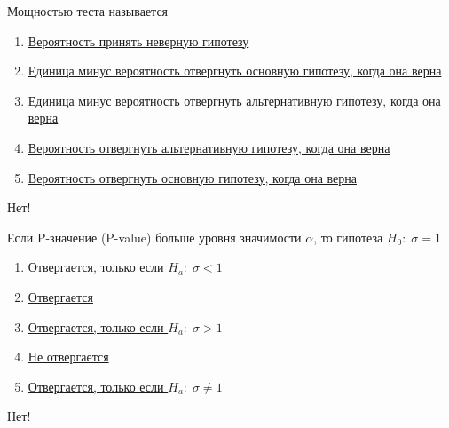 \documentclass[t]{beamer}
\begin{document}
 \begin{frame} \label{39-No} 
\begin{block}{39} 

Мощностью теста называется
 


 \end{block} 
\begin{enumerate} 
\item[] \hyperlink{39-No}{\beamergotobutton{} Вероятность принять неверную гипотезу}
\item[] \hyperlink{39-No}{\beamergotobutton{} Единица минус  вероятность отвергнуть основную гипотезу, когда она верна}
\item[] \hyperlink{39-Yes}{\beamergotobutton{} Единица минус  вероятность отвергнуть альтернативную гипотезу, когда она верна}
\item[] \hyperlink{39-No}{\beamergotobutton{} Вероятность отвергнуть альтернативную гипотезу, когда она верна}
\item[] \hyperlink{39-No}{\beamergotobutton{} Вероятность отвергнуть основную гипотезу, когда она верна}
\end{enumerate} 

 \alert{Нет!} 
\end{frame} 


 \begin{frame} \label{40-No} 
\begin{block}{40} 

Если P-значение (P-value) больше уровня значимости  $\alpha$, то гипотеза  $H_0: \; \sigma=1$


 \end{block} 
\begin{enumerate} 
\item[] \hyperlink{40-No}{\beamergotobutton{} Отвергается, только если  $H_a: \; \sigma<1$}
\item[] \hyperlink{40-No}{\beamergotobutton{} Отвергается}
\item[] \hyperlink{40-No}{\beamergotobutton{} Отвергается, только если  $H_a: \; \sigma>1$}
\item[] \hyperlink{40-Yes}{\beamergotobutton{} Не отвергается}
\item[] \hyperlink{40-No}{\beamergotobutton{} Отвергается, только если  $H_a: \; \sigma\neq 1$}
\end{enumerate} 

 \alert{Нет!} 
\end{frame} 
\end{document}
